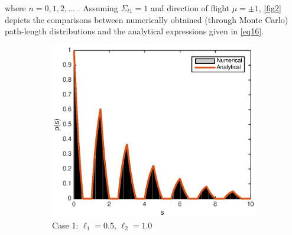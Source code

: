 \documentclass[12pt]{article}
\begin{document}
where $n=0, 1, 2, ...$ .
Assuming $\Sigma_{t1}=1$ and direction of flight $\mu=\pm 1$, \cref{fig2} depicts the comparisons between numerically obtained (through Monte Carlo) path-length distributions and the analytical expressions given in \cref{eq16}. 
\begin{figure}[hbt]
    \centering
    \begin{subfigure}{0.495\textwidth}
        \centering
        \includegraphics[width=\textwidth]{fig2a.eps}
        \caption{Case 1: $\ell_1=0.5$, $\ell_2=1.0$}
        \label{fig2a}
    \end{subfigure}
    \hfill
    \begin{subfigure}{0.495\textwidth}
        \centering

\end{subfigure}
\end{figure}
\end{document}
